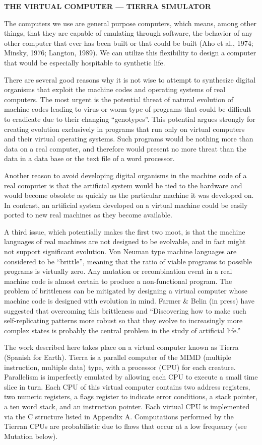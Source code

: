 \LP
\bf THE VIRTUAL COMPUTER --- TIERRA SIMULATOR\rm
\eLP

The computers we use are general purpose computers, which means, among
other things, that they are capable of emulating through software, the
behavior of any other computer that ever has been built or that could be
built (Aho et al., 1974; Minsky, 1976; Langton, 1989).  We can utilize
this flexibility to design a computer that would be especially hospitable
to synthetic life.

There are several good reasons why it is not wise to attempt to synthesize
digital organisms that exploit the machine codes and operating systems of
real computers.  The most urgent is the potential threat of natural evolution
of machine codes leading to virus or worm type of programs that could
be difficult to eradicate due to their changing ``genotypes''.  This potential
argues strongly for creating evolution exclusively in programs that run only
on virtual computers and their virtual operating systems.  Such programs
would be nothing more than data on a real computer, and therefore would
present no more threat than the data in a data base or the text file of a
word processor.

Another reason to avoid developing digital organisms in the machine code of
a real computer is that the artificial system would be tied to the hardware
and would become obsolete as quickly as the particular machine it was
developed on.  In contrast, an artificial system developed on a virtual
machine could be easily ported to new real machines as they become available.

A third issue, which potentially makes the first two moot, is that
the machine languages of real machines are not designed to be evolvable,
and in fact might not support significant evolution.  Von Neuman type
machine languages are considered to be ``brittle'', meaning that the
ratio of viable programs to possible programs is virtually zero.  Any
mutation or recombination event in a real machine code is almost certain
to produce a non-functional program.  The problem of brittleness can be
mitigated by designing a virtual computer whose machine code is designed
with evolution in mind.  Farmer \& Belin (in press) have suggested that
overcoming this brittleness and ``Discovering how to make such self-replicating
patterns more robust so that they evolve to increasingly more complex states
is probably the central problem in the study of artificial life.''

The work described here takes place on a virtual computer known as Tierra
(Spanish for Earth).
Tierra is a parallel computer of the MIMD (multiple instruction, multiple
data) type, with a processor (CPU) for each creature.  Parallelism is
imperfectly emulated by allowing each CPU to execute a small time slice in
turn.  Each CPU of this virtual computer contains two address registers,
two numeric registers, a flags register to indicate error conditions, a stack
pointer, a ten word stack, and an instruction pointer.  Each virtual 
CPU is implemented via the C structure listed in Appendix A.  Computations
performed by the Tierran CPUs are probabilistic due to flaws that occur at a
low frequency (see Mutation below).

